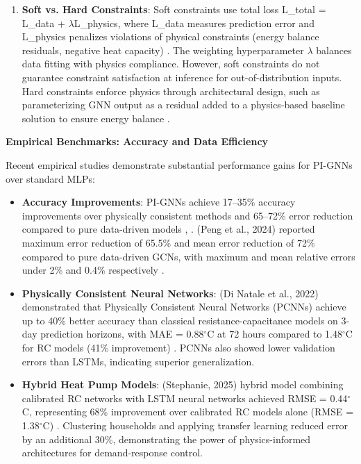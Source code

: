 \documentclass[12pt,a4paper]{article}
\begin{document}
\begin{enumerate}
  \item \textbf{Soft vs. Hard Constraints}: Soft constraints use total loss L\_total = L\_data + $\lambda$\textperiodcentered{}L\_physics, where L\_data measures prediction error and L\_physics penalizes violations of physical constraints (energy balance residuals, negative heat capacity) \cite{ref23}. The weighting hyperparameter $\lambda$ balances data fitting with physics compliance. However, soft constraints do not guarantee constraint satisfaction at inference for out-of-distribution inputs. Hard constraints enforce physics through architectural design, such as parameterizing GNN output as a residual added to a physics-based baseline solution to ensure energy balance \cite{ref24}.
\end{enumerate}

\textbf{Empirical Benchmarks: Accuracy and Data Efficiency}

Recent empirical studies demonstrate substantial performance gains for PI-GNNs over standard MLPs:

\begin{itemize}
  \item \textbf{Accuracy Improvements}: PI-GNNs achieve 17--35\% accuracy improvements over physically consistent methods and 65--72\% error reduction compared to pure data-driven models \cite{ref25}, \cite{ref26}. (Peng et al., 2024) reported maximum error reduction of 65.5\% and mean error reduction of 72\% compared to pure data-driven GCNs, with maximum and mean relative errors under 2\% and 0.4\% respectively \cite{ref27}.
\end{itemize}

\begin{itemize}
  \item \textbf{Physically Consistent Neural Networks}: (Di Natale et al., 2022) demonstrated that Physically Consistent Neural Networks (PCNNs) achieve up to 40\% better accuracy than classical resistance-capacitance models on 3-day prediction horizons, with MAE = 0.88$^\circ$C at 72 hours compared to 1.48$^\circ$C for RC models (41\% improvement) \cite{ref28}. PCNNs also showed lower validation errors than LSTMs, indicating superior generalization.
\end{itemize}

\begin{itemize}
  \item \textbf{Hybrid Heat Pump Models}: (Stephanie, 2025) hybrid model combining calibrated RC networks with LSTM neural networks achieved RMSE = 0.44$^\circ$C, representing 68\% improvement over calibrated RC models alone (RMSE = 1.38$^\circ$C) \cite{ref29}. Clustering households and applying transfer learning reduced error by an additional 30\%, demonstrating the power of physics-informed architectures for demand-response control.
\end{itemize}
\end{document}

